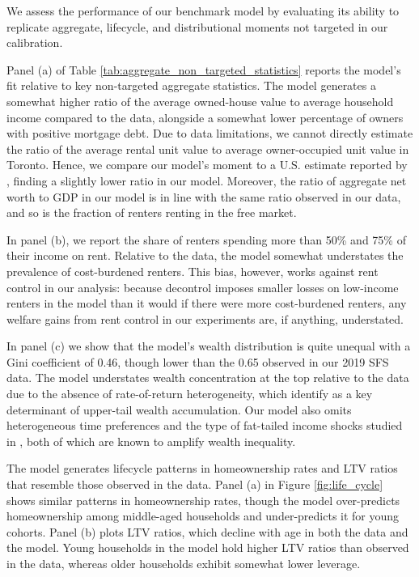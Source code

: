 \documentclass[parskip=full]{article}
\begin{document}
We assess the performance of our benchmark model by evaluating its ability to replicate aggregate, lifecycle, and distributional moments not targeted in our calibration. 

Panel (a) of Table \ref{tab:aggregate_non_targeted_statistics} reports the model's fit relative to key non-targeted aggregate statistics. The model generates a somewhat higher ratio of the average owned-house value to average household income compared to the data, alongside a somewhat lower percentage of owners with positive mortgage debt. Due to data limitations, we cannot directly estimate the ratio of the average rental unit value to average owner-occupied unit value in Toronto. Hence, we compare our model's moment to a U.S. estimate reported by \citet{chatterjee-eyigungor-2015}, finding a slightly lower ratio in our model. Moreover, the ratio of aggregate net worth to GDP in our model is in line with the same ratio observed in our data, and so is the fraction of renters renting in the free market.

In panel (b), we report the share of renters spending more than 50\% and 75\% of their income on rent. Relative to the data, the model somewhat understates the prevalence of cost-burdened renters. This bias, however, works against rent control in our analysis: because decontrol imposes smaller losses on low-income renters in the model than it would if there were more cost-burdened renters, any welfare gains from rent control in our experiments are, if anything, understated.

In panel (c) we show that the model's wealth distribution is quite unequal with a Gini coefficient of 0.46, though lower than the 0.65 observed in our 2019 SFS data. The model understates wealth concentration at the top relative to the data due to the absence of rate-of-return heterogeneity, which \citet{fagereng} identify as a key determinant of upper-tail wealth accumulation. Our model also omits heterogeneous time preferences \citep{ks-1998} and the type of fat-tailed income shocks studied in \citet{mj-shocks}, both of which are known to amplify wealth inequality.

The model generates lifecycle patterns in homeownership rates and LTV ratios that resemble those observed in the data. Panel (a) in Figure \ref{fig:life_cycle} shows similar patterns in homeownership rates, though the model over-predicts homeownership among middle-aged households and under-predicts it for young cohorts. Panel (b) plots LTV ratios, which decline with age in both the data and the model. Young households in the model hold higher LTV ratios than observed in the data, whereas older households exhibit somewhat lower leverage.
\end{document}
